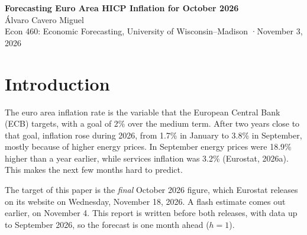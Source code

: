 \documentclass[11pt]{article}
\begin{document}
\begin{center}
{\LARGE\bfseries Forecasting Euro Area HICP Inflation for October 2026}\\[8pt]
{\large Álvaro Cavero Miguel}\\[3pt]
Econ 460: Economic Forecasting, University of Wisconsin--Madison \quad·\quad November 3, 2026
\end{center}

\begin{abstract}
\noindent I forecast euro area HICP annual inflation for October 2026, which Eurostat will publish on November 18, 2026. Instead of modelling the annual rate directly, I model the monthly change in the price index with monthly dummies and an autoregression, and rebuild the annual rate from the forecast index. The model is chosen by a rule set in advance: among 30 candidates, I discard those whose residuals fail the Box-Pierce test and pick the lowest BIC. The rule selects an AR(13) with fixed seasonal dummies. In a recursive out-of-sample exercise since 2015 it has the lowest root mean squared prediction error at every horizon against an AR and an ARMA for the annual rate and the random walk, although the gains at one month are small. Alternative specifications give October forecasts between 4.01\% and 4.15\%. My forecast is 4.1\%, with a 50\% interval of 3.9\% to 4.3\% and a 90\% interval of 3.5\% to 4.7\%.
\end{abstract}

\section{Introduction}

The euro area inflation rate is the variable that the European Central Bank (ECB) targets, with a goal of 2\% over the medium term. After two years close to that goal, inflation rose during 2026, from 1.7\% in January to 3.8\% in September, mostly because of higher energy prices. In September energy prices were 18.9\% higher than a year earlier, while services inflation was 3.2\% (Eurostat, 2026a). This makes the next few months hard to predict.

The target of this paper is the \emph{final} October 2026 figure, which Eurostat releases on its website on Wednesday, November 18, 2026. A flash estimate comes out earlier, on November 4. This report is written before both releases, with data up to September 2026, so the forecast is one month ahead ($h=1$).
\end{document}
